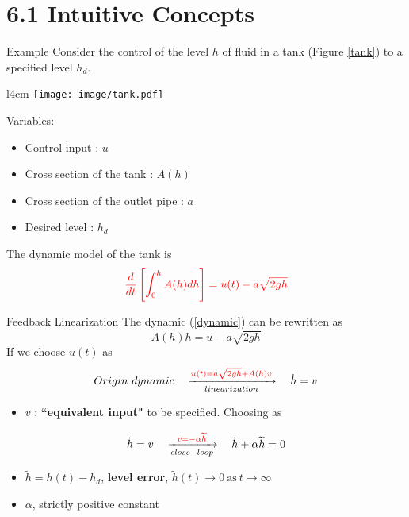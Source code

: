 \documentclass{beamer}
\begin{document}
  \section{6.1 Intuitive Concepts}

  \begin{frame}{Example}
    Consider the control of the level $h$ of fluid in a tank (Figure \ref{tank}) to a specified level $h_{d}$.
    \begin{wrapfigure}{l}{4cm}
    \vspace{-10pt}
    \texttt{[image: image/tank.pdf]}\\
    \vspace{-15pt}
    \caption{Fluid level control in a tank}\label{tank}
    \vspace{-10pt}
    \end{wrapfigure}
    Variables:
    \begin{itemize}
      \item \small{Control input} : $u$
      \item \small{Cross section of the tank} : $A(h)$
      \item \small{Cross section of the outlet pipe} : $a$
      \item \small{Desired level} : $h_{d}$
    \end{itemize}
    The dynamic model of the tank is
    \begin{equation}\label{dynamic}
      {\color{red}\frac{d}{dt}\left[\int_{0}^{h}A(h)dh\right] = u(t) - a \sqrt{2gh}}
    \end{equation}
  \end{frame}


  \begin{frame}{Feedback Linearization}
  The dynamic (\ref{dynamic}) can be rewritten as
  $$ A(h)\dot{h} = u-a\sqrt{2gh} $$
  If we choose $u(t)$ as
  $$
  Origin~dynamic \quad \xrightarrow[linearization]{{\color{red} u(t) = a\sqrt{2gh} + A(h)v}} \quad \dot{h}=v
  $$
  \vspace{-20pt}
  \begin{itemize}
    \item $v$ : \textbf{``equivalent input"} to be specified. Choosing as
  \end{itemize}
  $$
   \dot{h}=v \quad \xrightarrow[close-loop]{{\color{red} v=-\alpha \widetilde{h}}} \quad \dot{h}+\alpha \widetilde{h}=0
  $$
  \vspace{-20pt}
  \begin{itemize}
    \item $\widetilde{h} = h(t)-h_{d}$, \textbf{level error}, $\widetilde{h}(t)\rightarrow 0 ~\text{as}~ t \rightarrow \infty$
    \item $\alpha$, strictly positive constant
  \end{itemize}
  \end{frame}
\end{document}
